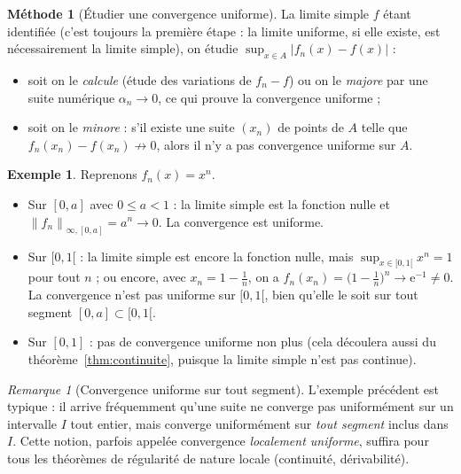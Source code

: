 \documentclass[11pt,a4paper]{article}
\theoremstyle{plain}
\theoremstyle{definition}
\newtheorem{exemple}[theoreme]{Exemple}
\newtheorem{methode}[theoreme]{Méthode}
\theoremstyle{remark}
\newtheorem{remarque}[theoreme]{Remarque}
\newcommand{\Ninf}[2]{\left\lVert #1 \right\rVert_{\infty,#2}}
\numberwithin{equation}{section}
\begin{document}
\begin{methode}[Étudier une convergence uniforme]\label{meth:cvu}
La limite simple $f$ étant identifiée (c'est toujours la première étape :
la limite uniforme, si elle existe, est nécessairement la limite simple),
on étudie $\sup_{x\in A}\lvert f_n(x)-f(x)\rvert$ :
\begin{itemize}
    \item soit on le \emph{calcule} (étude des variations de $f_n-f$) ou on
    le \emph{majore} par une suite numérique $\alpha_n\to 0$, ce qui prouve
    la convergence uniforme ;
    \item soit on le \emph{minore} : s'il existe une suite $(x_n)$ de points
    de $A$ telle que $f_n(x_n)-f(x_n)\not\to 0$, alors il n'y a pas
    convergence uniforme sur $A$.
\end{itemize}
\end{methode}

\begin{exemple}\label{ex:xn-uniforme}
Reprenons $f_n(x)=x^n$.
\begin{itemize}
    \item Sur $[0,a]$ avec $0\leq a<1$ : la limite simple est la fonction
    nulle et $\Ninf{f_n}{[0,a]}=a^n\to 0$. La convergence est uniforme.
    \item Sur $[0,1[$ : la limite simple est encore la fonction nulle, mais
    $\sup_{x\in[0,1[}x^n = 1$ pour tout $n$ ; ou encore, avec
    $x_n = 1-\frac1n$, on a $f_n(x_n)=\bigl(1-\frac1n\bigr)^n\to
    \mathrm{e}^{-1}\neq 0$. La convergence n'est pas uniforme sur $[0,1[$,
    bien qu'elle le soit sur tout segment $[0,a]\subset[0,1[$.
    \item Sur $[0,1]$ : pas de convergence uniforme non plus (cela
    découlera aussi du théorème~\ref{thm:continuite}, puisque la limite
    simple n'est pas continue).
\end{itemize}
\end{exemple}

\begin{remarque}[Convergence uniforme sur tout segment]\label{rem:segment}
L'exemple précédent est typique : il arrive fréquemment qu'une suite ne
converge pas uniformément sur un intervalle $I$ tout entier, mais converge
uniformément sur \emph{tout segment} inclus dans $I$. Cette notion, parfois
appelée convergence \emph{localement uniforme}, suffira pour tous les
théorèmes de régularité de nature locale (continuité, dérivabilité).
\end{remarque}
\end{document}
